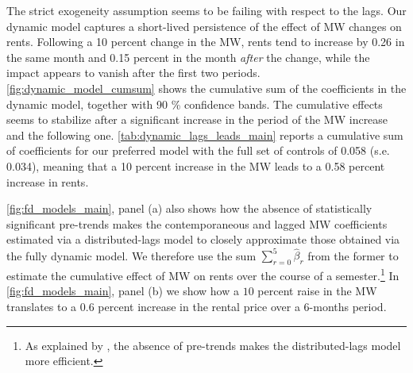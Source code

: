 The strict exogeneity assumption seems to be failing with respect to the lags. Our dynamic model 
captures a short-lived persistence of the effect of MW changes on rents. Following a 10 percent 
change in the MW, rents tend to increase by 0.26 in the same month and 0.15 percent in the month 
\textit{after} the change, while the impact appears to vanish after the first two periods. 
\autoref{fig:dynamic_model_cumsum} shows the cumulative sum of the coefficients in the dynamic model,
together with 90 \% confidence bands. The cumulative effects seems to stabilize after a significant 
increase in the period of the MW increase and the following one. \autoref{tab:dynamic_lags_leads_main}
reports a cumulative sum of coefficients for our preferred model with the full set of controls 
of 0.058 (s.e. 0.034), meaning that a 10 percent increase in the MW leads to a 0.58 percent increase 
in rents.

\autoref{fig:fd_models_main}, panel (a) also shows how the absence of statistically significant 
pre-trends makes the contemporaneous and lagged MW coefficients estimated via a distributed-lags
model to closely approximate those obtained via the fully dynamic model. 
We therefore use the sum $\sum\limits_{r = 0}^{5}\hat\beta_r$ from 
the former to estimate the cumulative effect of MW on rents over the course of a semester.\footnote{As 
	explained by \textcite{BorusyakJaravel2017}, the absence of pre-trends  makes the distributed-lags model 
more efficient.} 
In \autoref{fig:fd_models_main}, panel (b) we show how a $10$ percent raise in the MW 
translates to a $0.6$ percent increase in the rental price over a 6-months period. 

